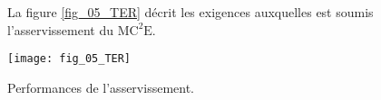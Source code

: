 
\ifprof
\else

La figure \ref{fig_05_TER} décrit les exigences auxquelles est soumis l'asservissement du $\text{MC}^2\text{E}$.

\begin{marginfigure}
\texttt{[image: fig\_05\_TER]}
\caption{Performances de l'asservissement. \label{fig_05_TER}}
\end{marginfigure}
\fi


